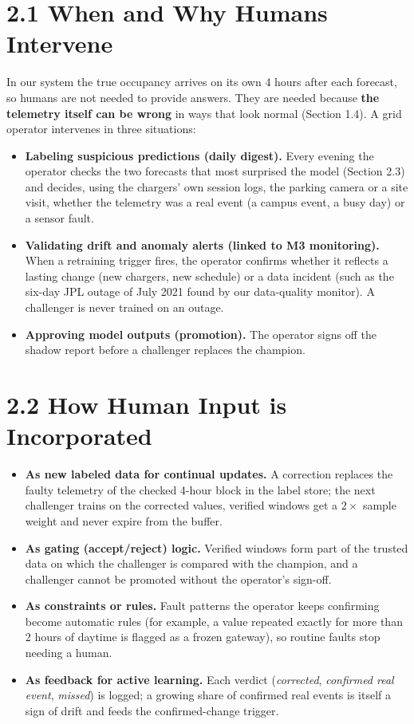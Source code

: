 \documentclass[11pt,letterpaper]{article}
\begin{document}
\section*{2.1 When and Why Humans Intervene}

In our system the true occupancy arrives on its own 4 hours after each forecast, so humans are not needed to provide
answers. They are needed because \textbf{the telemetry itself can be wrong} in ways that look normal (Section 1.4).
A grid operator intervenes in three situations:
\begin{itemize}
  \item \textbf{Labeling suspicious predictions (daily digest).} Every evening the operator checks the two forecasts
  that most surprised the model (Section 2.3) and decides, using the chargers' own session logs, the parking camera or
  a site visit, whether the telemetry was a real event (a campus event, a busy day) or a sensor fault.
  \item \textbf{Validating drift and anomaly alerts (linked to M3 monitoring).} When a retraining trigger fires, the
  operator confirms whether it reflects a lasting change (new chargers, new schedule) or a data incident (such as the
  six-day JPL outage of July 2021 found by our data-quality monitor). A challenger is never trained on an outage.
  \item \textbf{Approving model outputs (promotion).} The operator signs off the shadow report before a challenger
  replaces the champion.
\end{itemize}

\section*{2.2 How Human Input is Incorporated}

\begin{itemize}
  \item \textbf{As new labeled data for continual updates.} A correction replaces the faulty telemetry of the checked
  4-hour block in the label store; the next challenger trains on the corrected values, verified windows get a
  $2\times$ sample weight and never expire from the buffer.
  \item \textbf{As gating (accept/reject) logic.} Verified windows form part of the trusted data on which the challenger
  is compared with the champion, and a challenger cannot be promoted without the operator's sign-off.
  \item \textbf{As constraints or rules.} Fault patterns the operator keeps confirming become automatic rules (for
  example, a value repeated exactly for more than 2 hours of daytime is flagged as a frozen gateway), so routine
  faults stop needing a human.
  \item \textbf{As feedback for active learning.} Each verdict (\emph{corrected}, \emph{confirmed real event},
  \emph{missed}) is logged; a growing share of confirmed real events is itself a sign of drift and feeds the
  confirmed-change trigger.
\end{itemize}
\end{document}
